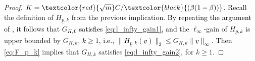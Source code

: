 \documentclass[journal,twoside,web]{ieeecolor}
\begin{document}
\begin{proof}
	 $K=\textcolor{red}{\sqrt{m}}C/\textcolor{black}{(\beta(1-\beta))}$.
         Recall the definition of $H_{\underline{p},k}$ from the previous implication.
         \textcolor{black}{By repeating the argument of \cite[Chapter 7d, Theorem 17]{Cal:Des},}
         it follows that 
         \textcolor{black}{$G_{H,0}$ satisfies \eqref{eq:l_infty_gain1}, and}
         the $\ell_{\infty}$-gain of $H_{\underline{p},k}$ is upper bounded by $G_{H,k}$, \textcolor{black}{$k \ge 1$,} \textcolor{black}{i.e., $\|H_{\underline{p},k}(\underline{v})\|_2 \le G_{H,k} \|\underline{v}\|_{\infty}$.}
         Then \eqref{eq:F_p_k} implies that $G_{H,k}$ satisfies \eqref{eq:l_infty_gain2},
         for $k \ge 1$. %
  \end{proof}
\end{document}
